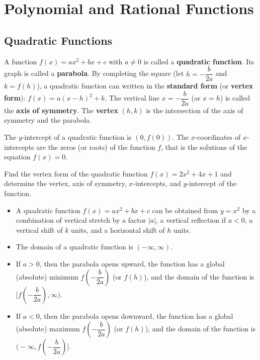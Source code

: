 
\chapter{Polynomial and Rational Functions}

\section{Quadratic Functions}
\begin{definition}
  A function $f(x)=ax^2+bx+c$ with $a\ne 0$ is called a \textbf{quadratic function}. Its graph is called a \textbf{parabola}. By completing the square (let $h=-\dfrac{b}{2a}$ and $k=f(h)$), a quadratic function can written in the \textbf{standard form} (or \textbf{vertex form}): $f(x)=a(x-h)^2+k$. The vertical line $x=-\dfrac{b}{2a}$ (or $x=h$) is called the \textbf{axis of symmetry}. The \textbf{vertex} $(h,k)$ is the intersection of the axis of symmetry and the parabola.
\end{definition}
\begin{note}
  The $y$-intercept of a quadratic function is $(0, f(0))$. The $x$-coordinates of $x$-intercepts are the zeros (or roots) of the function $f$, that is the solutions of the equation $f(x)=0$.
\end{note}

\begin{example}
  Find the vertex form of the quadratic function $f(x)=2 x^{2} + 4 x + 1$ and determine the vertex, axis of symmetry, $x$-intercepts, and $y$-intercept of the function.
\end{example}

\begin{note}
  \begin{itemize}
    \item A quadratic function $f(x)=ax^2+bx+c$ can be obtained from $y=x^2$ by a combination of vertical stretch by a factor $|a|$, a vertical reflection if $a<0$, a vertical shift of $k$ units, and a horizontal shift of $h$ units.
    \item The domain of a quadratic function is $(-\infty, \infty)$.
    \item If $a>0$, then the parabola opens upward, the function has a global (absolute) minimum $f\left(-\dfrac{b}{2a}\right)$ (or $f(h)$), and the domain of the function is $\bigg[f\left(-\dfrac{b}{2a}\right), \infty\bigg)$.
    \item If $a<0$, then the parabola opens downward, the function has a global (absolute) maximum $f\left(-\dfrac{b}{2a}\right)$ (or $f(h)$), and the domain of the function is $\bigg(-\infty,f\left(-\dfrac{b}{2a}\right)\bigg]$.
  \end{itemize}
\end{note}
\newpage

